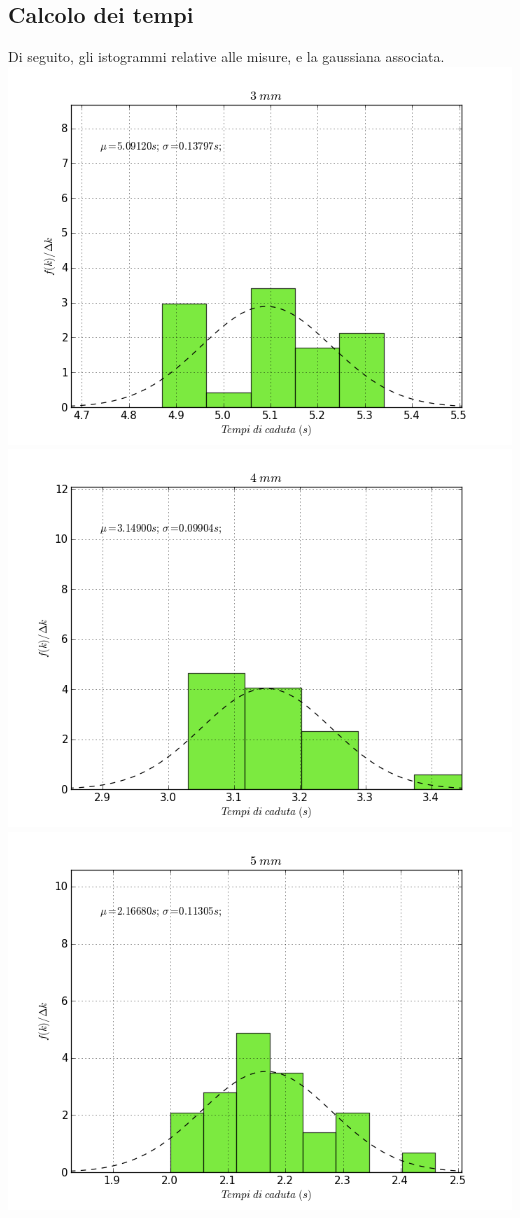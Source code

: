 \subsection{Calcolo dei tempi}
Di seguito, gli istogrammi relative alle misure, e la gaussiana associata.
\\
\includegraphics[scale=0.4]{"../grafici/3mm"}
\includegraphics[scale=0.4]{"../grafici/4mm"}
\\
\includegraphics[scale=0.4]{"../grafici/5mm"}
